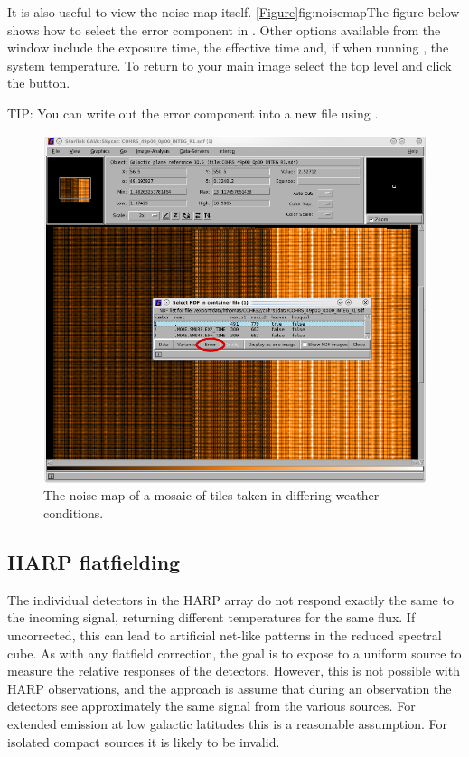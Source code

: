 \documentclass[11pt,oneside,chapters]{starlink}
\begin{document}
It is also useful to view the noise map itself.
\cref{Figure}{fig:noisemap}{The figure below} shows how to select the
error component in \gaia. Other options available from the
 window include the exposure
time, the effective time and, if  when running
\makecube, the system temperature. To return to your main image select
the top level and click the  button.

\begin{tip}
TIP: You can write out the error component into a new file using
\ndfcopy.
\begin{terminalv}
\end{terminalv}
\end{tip}


\begin{figure}[h!]
\begin{center}
\includegraphics[width=0.6\linewidth]{sc20_noimap}
\caption[The noise map of a mosaic of tiles.]{\label{fig:noisemap}
  The noise map of a mosaic of tiles taken in differing weather
  conditions.}
\end{center}
\end{figure}


\subsection{HARP flatfielding}
\label{sec:flatfield}

The individual detectors in the HARP array do not respond exactly the
same to the incoming signal, returning different temperatures for the
same flux.  If uncorrected, this can lead to artificial net-like
patterns in the reduced spectral cube.  As with any flatfield
correction, the goal is to expose to a uniform source to measure the
relative responses of the detectors.  However, this is not possible
with HARP observations, and the approach is assume that during an
observation the detectors see approximately the same signal from the
various sources.  For extended emission at low galactic latitudes this
is a reasonable assumption.  For isolated compact sources it is likely
to be invalid.
\end{document}
